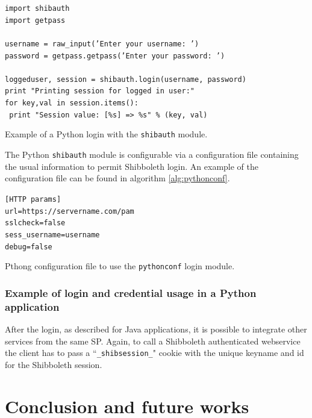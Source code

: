 \begin{algorithm}[t]
\SetAlgoNoLine
\texttt{import shibauth}\\
\texttt{import getpass}\\
\texttt{}\\
\texttt{username = raw\_input('Enter your username: ')}\\
\texttt{password = getpass.getpass('Enter your password: ')}\\
\texttt{}\\
\texttt{loggeduser, session =  shibauth.login(username, password)}\\
\texttt{print "Printing session for logged in user:"}\\
\texttt{for key,val in session.items():}\\
\texttt{    print "Session value: [\%s] => \%s" \% (key, val)}
\caption{Example of a Python login with the \texttt{shibauth} module.}
\label{alg:python}
\end{algorithm}

The Python \texttt{shibauth} module is configurable via a configuration file containing the usual information to
permit Shibboleth login.
An example of the configuration file can be found in algorithm \ref{alg:pythonconf}.

\begin{algorithm}[t]
\SetAlgoNoLine
\texttt{[HTTP params]}\\
\texttt{url=https://servername.com/pam}\\
\texttt{sslcheck=false}\\
\texttt{sess\_username=username}\\
\texttt{debug=false}
\caption{Pthong configuration file to use the \texttt{pythonconf} login module.}
\label{alg:pythonconf}
\end{algorithm}

\label{sec:javaws}
\subsubsection{Example of login and credential usage in a Python application}
After the login, as described for Java applications, it is possible to integrate other services from the same SP.
Again, to call a Shibboleth authenticated webservice the client has to pass a ``\texttt{\_shibsession\_}" cookie
with the unique keyname and id for the Shibboleth session.

\label{sec:conclusion}
\section{Conclusion and future works}

